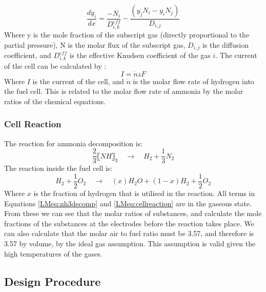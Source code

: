 \begin{equation}
\frac{dy_{i}}{dx}=  \frac{-N_i}{D_{i,k}^{eff}}  - \frac{(y_j N_i- y_i N_j)}{D_{i,j}}
\end{equation}
Where y is the mole fraction of the subscript gas (directly proportional to the partial pressure), N is the molar flux of the subscript gas, $D_{i,j}$ is the diffusion coefficient, and $D_{i,k}^{eff}$ is the effective Knudsen coefficient of the gas $i$. 
The current of the cell can be calculated by \cite{LM2}:
\begin{equation}
I= \dot n zF					
\end{equation}
Where $I$ is the current of the cell, and $\dot n$ is the molar flow rate of hydrogen into the fuel cell. This is related to the molar flow rate of ammonia by the molar ratios of the chemical equations.


    \subsubsection{Cell Reaction}
    \label{LMcellreaction}
    The reaction for ammonia decomposition is:
    \begin{equation}
\frac{2}{3} 〖NH〗_3   \quad \rightarrow \quad   H_2 +  \frac{1}{3} N_2	
\label{LMeq:nh3decomp}
\end{equation}
\newline
The reaction inside the fuel cell is:
\begin{equation}
H_2+  \frac{1}{2} O_2   \quad \rightarrow \quad  (x)H_2 O + (1-x)H_2 +  \frac{1}{2} O_2
\label{LMeq:cellreaction}
\end{equation}
Where $x$ is the fraction of hydrogen that is utilised in the reaction. All terms in Equations \ref{LMeq:nh3decomp} and \ref{LMeq:cellreaction} are in the gaseous state. From these we can see that the molar ratios of substances, and calculate the mole fractions of the substances at the electrodes before the reaction takes place. We can also calculate that the molar air to fuel ratio must be 3.57, and therefore is 3.57 by volume, by the ideal gas assumption. This assumption is valid given the high temperatures of the gases.


\subsection{Design Procedure}

